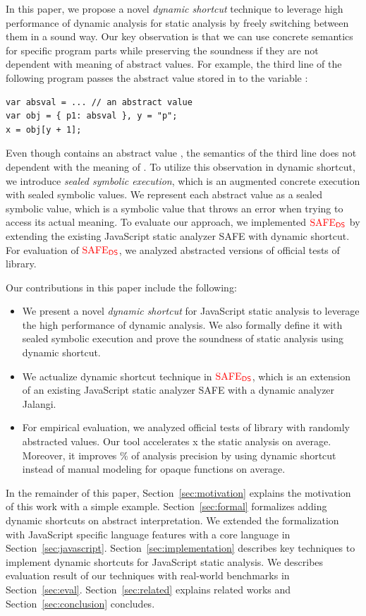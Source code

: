 In this paper, we propose a novel \textit{dynamic shortcut} technique to
leverage high performance of dynamic analysis for static analysis by freely
switching between them in a sound way.  Our key observation is that we can
use concrete semantics for specific program parts while preserving the soundness
if they are not dependent with meaning of abstract values.  For example, the
third line of the following program passes the abstract value 
stored in  to the variable :
\begin{lstlisting}[style=myJSstyle,numbers=none]
var absval = ... // an abstract value
var obj = { p1: absval }, y = "p";
x = obj[y + 1];
\end{lstlisting}
Even though  contains an abstract value , the
semantics of the third line does not dependent with the meaning of
.  To utilize this observation in dynamic shortcut, we introduce
\textit{sealed symbolic execution}, which is an augmented concrete execution
with sealed symbolic values.  We represent each abstract value as a sealed
symbolic value, which is a symbolic value that throws an error when trying to
access its actual meaning.  To evaluate our approach, we implemented ${\color{red}{\text{SAFE}_{\textsf{DS}}}}$ by
extending the existing JavaScript static analyzer SAFE with dynamic shortcut.
For evaluation of ${\color{red}{\text{SAFE}_{\textsf{DS}}}}$, we analyzed abstracted versions of 
official tests of  library.

Our contributions in this paper include the following:
\begin{itemize}
  \item We present a novel \textit{dynamic shortcut} for JavaScript static
    analysis to leverage the high performance of dynamic analysis.  We also
    formally define it with sealed symbolic execution and prove the soundness of
    static analysis using dynamic shortcut.
  \item We actualize dynamic shortcut technique in ${\color{red}{\text{SAFE}_{\textsf{DS}}}}$, which is an
    extension of an existing JavaScript static analyzer SAFE with a dynamic
    analyzer Jalangi.
  \item For empirical evaluation, we analyzed  official tests of
     library with randomly abstracted values.  Our tool
    accelerates x the static analysis on average.  Moreover, it
    improves \% of analysis precision by using dynamic shortcut
    instead of manual modeling for  opaque functions on average.
\end{itemize}

In the remainder of this paper, Section~\ref{sec:motivation} explains the
motivation of this work with a simple example.  Section~\ref{sec:formal}
formalizes adding dynamic shortcuts on abstract interpretation.  We extended the
formalization with JavaScript specific language features with a core language in
Section~\ref{sec:javascript}.  Section~\ref{sec:implementation} describes
key techniques to implement dynamic shortcuts for JavaScript static analysis.
We describes evaluation result of our techniques with real-world benchmarks in
Section~\ref{sec:eval}.  Section~\ref{sec:related} explains related works and
Section~\ref{sec:conclusion} concludes.
